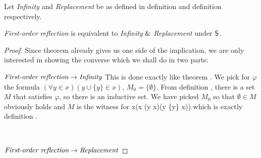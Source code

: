 
Let \emph{Infinity} and \emph{Replacement} be as defined in definition  and definition  respectively.

\begin{theorem}\label{theorem:levy_equivalence_contemporary}
\emph{First-order reflection} is equivalent to \emph{Infinity} $ \mathrel{\&} $ \emph{Replacement} under $\sf{S}$.
\end{theorem}
\begin{proof}
Since theorem  already gives us one side of the implication, we are only interested in showing the converse which we shall do in two parts:

$\bold{\emph{First-order reflection} \rightarrow \emph{Infinity}}$
This is done exactly like theorem . We pick for $\varphi$ the formula $(\forall y \in x)(y \cup \{y\} \in x)$, $M_0 = \{\emptyset\}$. From definition , there is a set $M$ that satisfies $\varphi$, so there is an inductive set. We have picked $M_0$ so that $\emptyset \in M$ obviously holds and $M$ is the witness for 
\beq
\exists x(\emptyset \in x \et (\forall y \in x)(y \cup \{y\} \in x))
\eeq
which is exactly definition .

\

$\bold{\emph{First-order reflection} \rightarrow \emph{Replacement}}$



\end{proof}
